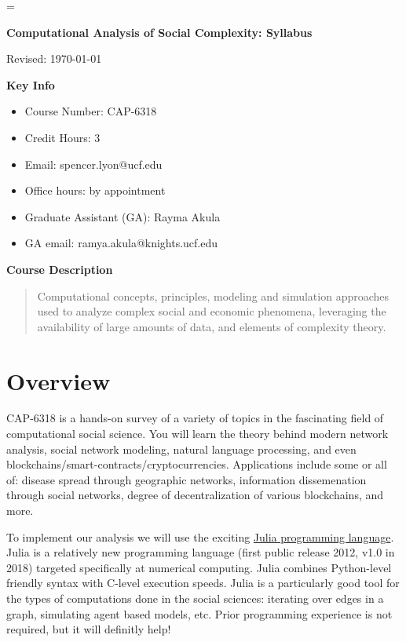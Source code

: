 \documentclass[11pt]{article}
\begin{document}
\parskip=\bigskipamount
\parindent=0.0in
\thispagestyle{empty}


\bigskip\bigskip
\centerline{\Large \bf Computational Analysis of Social Complexity:  Syllabus}
\centerline{Revised: \today}

\textbf{Key Info}

\begin{itemize}[label={}]
    \setlength\itemsep{0.2em}
    \item Course Number:  CAP-6318
    \item Credit Hours: 3
    \item Email: spencer.lyon@ucf.edu
    \item Office hours: by appointment
    \item Graduate Assistant (GA): Rayma Akula
    \item GA email: ramya.akula@knights.ucf.edu
\end{itemize}

\textbf{Course Description}
\begin{quote}
    Computational concepts, principles, modeling and simulation approaches used
    to analyze complex social and economic phenomena, leveraging the
    availability of large amounts of data, and elements of complexity theory.
\end{quote}


\section*{Overview}

CAP-6318 is a hands-on survey of a variety of topics in the fascinating field of
computational social science. You will learn the theory behind modern network
analysis, social network modeling, natural language processing, and even
blockchains/smart-contracts/cryptocurrencies.  Applications include some or all
of: disease spread through geographic networks, information dissemenation
through social networks, degree of decentralization of various blockchains, and
more.

To implement our analysis we will use the exciting
\href{https://julialang.org}{Julia programming language}. Julia is a relatively
new programming language (first public release 2012, v1.0 in 2018) targeted
specifically at numerical computing. Julia combines Python-level friendly syntax
with C-level execution speeds. Julia is a particularly good tool for the types
of computations done in the social sciences: iterating over edges in a graph,
simulating agent based models, etc. Prior programming experience is not
required, but it will definitly help!
\end{document}
